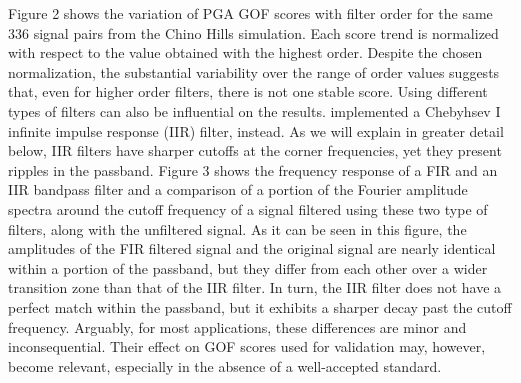 \documentclass{article}
\begin{document}
Figure 2 shows the variation of PGA GOF scores with filter order for the same 336 signal pairs from the Chino Hills simulation. Each score trend is normalized with respect to the value obtained with the highest order. Despite the chosen normalization, the substantial variability over the range of order values suggests that, even for higher order filters, there is not one stable score. Using different types of filters can also be influential on the results. \citet{Khoshnevis2015} implemented a Chebyhsev I infinite impulse response (IIR) filter, instead. As we will explain in greater detail below, IIR filters have sharper cutoffs at the corner frequencies, yet they present ripples in the passband. Figure 3 shows the frequency response of a FIR and an IIR bandpass filter and a comparison of a portion of the Fourier amplitude spectra around the cutoff frequency of a signal filtered using these two type of filters, along with the unfiltered signal. As it can be seen in this figure, the amplitudes of the FIR filtered signal and the original signal are nearly identical within a portion of the passband, but they differ from each other over a wider transition zone than that of the IIR filter.
In turn, the IIR filter does not have a perfect match within the passband, but it exhibits a sharper decay past the cutoff frequency. Arguably, for most applications, these differences are minor and inconsequential. Their effect on GOF scores used for validation may, however, become relevant, especially in the absence of a well-accepted standard. 
\end{document}
